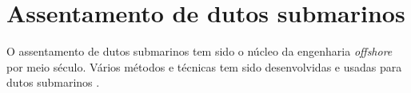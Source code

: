 \chapter{Assentamento de dutos submarinos}
\label{chap:assentamento}

O assentamento de dutos submarinos tem sido o núcleo da engenharia \textit{offshore} por meio século. Vários métodos e técnicas tem sido desenvolvidas e usadas para dutos submarinos \citet{Ivi2016}.